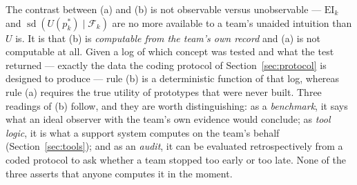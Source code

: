 \documentclass[11pt]{article}
\newcommand{\filt}{\mathcal{F}}     %
\begin{document}
\noindent The contrast between (a) and (b) is not observable versus unobservable --- $\mathrm{EI}_k$ and $\operatorname{sd}(U(p^*_k)\mid\filt_k)$ are no more available to a team's unaided intuition than $U$ is. It is that (b) is \emph{computable from the team's own record} and (a) is not computable at all. Given a log of which concept was tested and what the test returned --- exactly the data the coding protocol of Section~\ref{sec:protocol} is designed to produce --- rule (b) is a deterministic function of that log, whereas rule (a) requires the true utility of prototypes that were never built. Three readings of (b) follow, and they are worth distinguishing: as a \emph{benchmark}, it says what an ideal observer with the team's own evidence would conclude; as \emph{tool logic}, it is what a support system computes on the team's behalf (Section~\ref{sec:tools}); and as an \emph{audit}, it can be evaluated retrospectively from a coded protocol to ask whether a team stopped too early or too late. None of the three asserts that anyone computes it in the moment.
\end{document}
